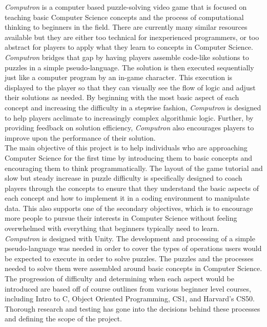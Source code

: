 \textit{Computron} is a computer based puzzle-solving video game that is focused
on teaching basic Computer Science concepts and the process of computational
thinking to beginners in the field. There are currently many similar resources
available but they are either too technical for inexperienced programmers, or
 too abstract for players to apply what they learn to concepts in Computer
Science. \textit{Computron} bridges that gap by having players assemble code-like
solutions to puzzles in a simple pseudo-language. The solution is then executed
sequentially just like a computer program by an in-game character. This
execution is displayed to the player so that they can visually see the flow of
logic and adjust their solutions as needed. By beginning with the most basic
aspect of each concept and increasing the difficulty in a stepwise fashion,
\textit{Computron} is designed to help players acclimate to increasingly complex
algorithmic logic. Further, by providing feedback on solution efficiency,
\textit{Computron} also encourages players to improve upon the performance of
their solution.\\

The main objective of this project is to help individuals who are approaching
Computer Science for the first time by introducing them to basic concepts and
encouraging them to think programmatically. The layout of the game tutorial
and slow but steady increase in puzzle difficulty is specifically designed to coach
players through the concepts to ensure that they understand the basic aspects
of each concept and how to implement it in a coding environment to manipulate
data. This also supports one of the secondary objectives, which is to encourage
more people to pursue their interests in Computer Science without feeling
overwhelmed with everything that beginners typically need to learn.\\

\textit{Computron} is designed with Unity. The development and processing of a simple pseudo-language was needed in order to cover the types of operations users would be expected to execute in order to solve puzzles. The puzzles and the processes needed to solve them were assembled around basic concepts in Computer Science. The progression of difficulty and determining when each aspect would be introduced are based off of course outlines from various beginner level courses, including Intro to C, Object Oriented Programming, CS1, and Harvard's CS50. Thorough research and testing has gone into the decisions behind these processes and defining the scope of the project.\\
